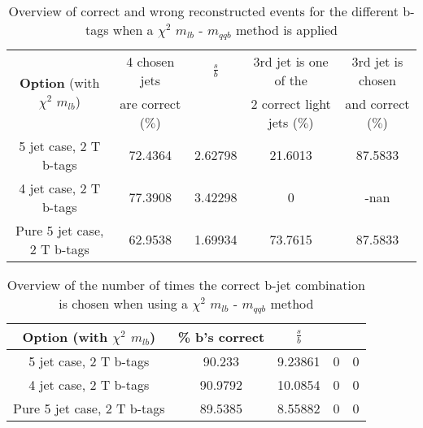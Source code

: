  \begin{table}[!h] 
 \begin{tabular}{c|c|c|c|c} 
\multirow{2}{*}{\textbf{Option} (with $\chi^{2}$ $m_{lb}$)} & 4 chosen jets & $\frac{s}{b}$ & 3rd jet is one of the & 3rd jet is chosen \\ & are correct ($\%$)    & 	             & 2 correct light jets ($\%$) &  and correct ($\%$)	  \\ \hline 
 5 jet case,      2 T b-tags              & 72.4364 & 2.62798 & 21.6013 & 87.5833 \\ 
 4 jet case,      2 T b-tags              & 77.3908 & 3.42298 & 0 & -nan \\ 
 Pure 5 jet case, 2 T b-tags              & 62.9538 & 1.69934 & 73.7615 & 87.5833 \\ 
 \end{tabular} 
 \caption{Overview of correct and wrong reconstructed events for the different b-tags when a $\chi^{2}$ $m_{lb}$ - $m_{qqb}$ method is applied} 
 \end{table} 
 
 \begin{table}[!h] 
 \begin{tabular}{c|c|c|c|c} 
 \textbf{Option} (with $\chi^{2}$ $m_{lb}$) & \% b's correct   & $\frac{s}{b}$ &  &  \\ \hline 
 5 jet case,      2 T b-tags              & 90.233 & 9.23861 & 0 & 0 \\ 
 4 jet case,      2 T b-tags              & 90.9792 & 10.0854 & 0 & 0 \\ 
 Pure 5 jet case, 2 T b-tags              & 89.5385 & 8.55882 & 0 & 0 \\ 
 \end{tabular} 
 \caption{Overview of the number of times the correct b-jet combination is chosen when using a $\chi^{2}$ $m_{lb}$ - $m_{qqb}$ method} 
 \end{table} 
 
